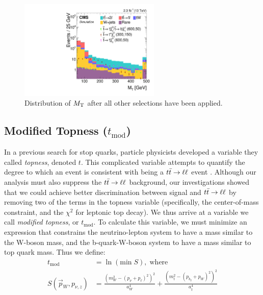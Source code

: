 \begin{figure}[htb]
\centering
\includegraphics[width=0.6\textwidth]{figures/nminusone_mt.pdf}
\caption{Distribution of $M_\text{T}$ after all other selections have been applied.}
\label{fig:stop:mt:nminusone}
\end{figure}

\subsection{Modified Topness (\texorpdfstring{$t_{\text{mod}}$}{tmod})}
\label{ssec:stop:tmod}

In a previous search for stop quarks, particle physicists developed a
variable they called \emph{topness}, denoted $t$. This complicated
variable attempts to quantify the degree to which an event is
consistent with being a $t\bar{t} \rightarrow \ell\ell$ event \cite{topness}. Although our
analysis must also suppress the $t\bar{t} \rightarrow \ell\ell$ background, our
investigations showed that we could achieve better discrimination
between signal and $t\bar{t} \rightarrow \ell\ell$ by removing two of the terms in the
topness variable (specifically, the center-of-mass constraint, and the
$\chi^2$ for leptonic top decay). We thus arrive at a variable we call
\emph{modified topness}, or $t_\text{mod}$. To calculate this
variable, we must minimize an expression that constrains the
neutrino-lepton system to have a mass similar to the W-boson mass, and the
b-quark-W-boson system to have a mass similar to top quark mass. Thus
we define:
\begin{equation}
\label{eq:stop:tmod}
\begin{split}
t_\text{mod} & = \ln ( \text{min} \; S ), \; \text{where} \\
S(\vec{p}_W, p_{\nu,z}) & = \frac{(m_W^2-(p_\nu+p_\ell)^2)^2}{a_W^4} + \frac{(m_t^2 - (p_{b_2}+p_W)^2)^2}{a_t^4}
\end{split}
\end{equation}

